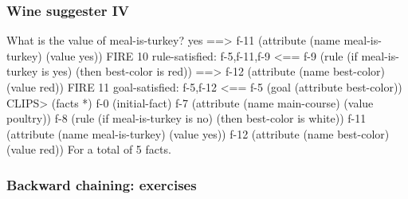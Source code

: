 \documentclass[xcolor={usenames,dvipsnames,svgnames}, compress]{beamer}
\begin{document}
\begin{frame}[fragile]
  \frametitle{Wine suggester IV}
  \begin{clips-code}[firstnumber=35]
    What is the value of meal-is-turkey? yes
    ==> f-11    (attribute (name meal-is-turkey) (value yes))
    FIRE   10 rule-satisfied: f-5,f-11,f-9
    <== f-9     (rule (if meal-is-turkey is yes) (then best-color is red))
    ==> f-12    (attribute (name best-color) (value red))
    FIRE   11 goal-satisfied: f-5,f-12
    <== f-5     (goal (attribute best-color))
    CLIPS> (facts *)
    f-0     (initial-fact)
    f-7     (attribute (name main-course) (value poultry))
    f-8     (rule (if meal-is-turkey is no) (then best-color is white))
    f-11    (attribute (name meal-is-turkey) (value yes))
    f-12    (attribute (name best-color) (value red))
    For a total of 5 facts.
  \end{clips-code}
\end{frame}

\begin{frame}
  \frametitle{Backward chaining: exercises}
  
\end{frame}


\end{document}
